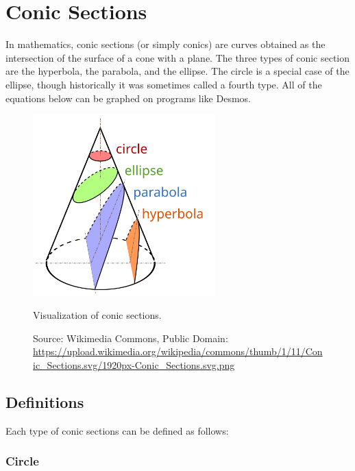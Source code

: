 \chapter{Conic Sections}

In mathematics, conic sections (or simply conics) are curves obtained
as the intersection of the surface of a cone with a plane. The three
types of conic section are the hyperbola, the parabola, and the
ellipse. The circle is a special case of the ellipse, though
historically it was sometimes called a fourth type. All of the equations below can be graphed on programs like Desmos. 

\begin{center}
    

\end{center}

\begin{figure}[htbp]
  \centering
  \includegraphics[width=7cm]{Conic_Sections.png}
  \caption{Visualization of conic sections.}
  \caption*{\small Source: Wikimedia Commons, Public Domain: \url{https://upload.wikimedia.org/wikipedia/commons/thumb/1/11/Conic_Sections.svg/1920px-Conic_Sections.svg.png}}
\end{figure}


\section{Definitions}

Each type of conic sections can be defined as follows:

\subsection{Circle}

